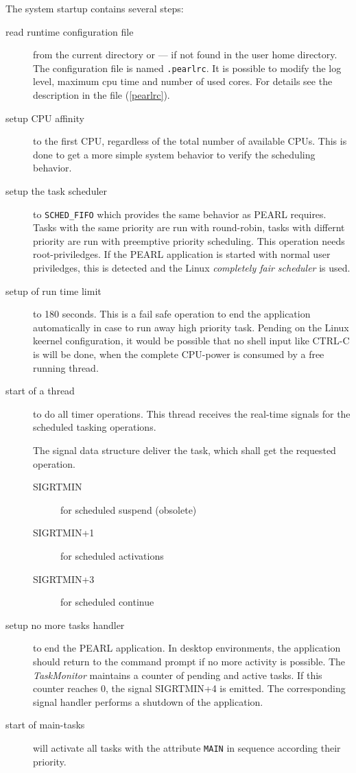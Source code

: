 The system startup contains several steps:
\begin{description}
\item[read runtime configuration file] from the current directory or ---
   if not found in the user home directory.
   The configuration file is named \texttt{.pearlrc}.
   It is possible to modify the log level, maximum cpu time and number of 
   used cores. 
   For details see the description in the file (\ref{pearlrc}).
\item[setup CPU affinity] to the first CPU, regardless of the
   total number of available CPUs. This is done to get a more simple
   system behavior to verify the scheduling behavior.
\item[setup the task scheduler] to \verb|SCHED_FIFO| which provides
   the same behavior as PEARL requires. Tasks with the same priority
   are run with round-robin, tasks with differnt priority are run with
   preemptive priority scheduling.
   This operation needs root-priviledges. If the PEARL application is 
   started with normal user priviledges, this is detected and the 
   Linux {\em completely fair scheduler} is used.
\item[setup of run time limit] to 180 seconds. This is a fail safe
   operation to end the application automatically in case to run away
   high priority task. Pending on the Linux keernel configuration,
   it would be possible that no shell input like CTRL-C is will
   be done, when the complete CPU-power is consumed by a free running thread.
\item[start of a thread] to do all timer operations. This thread 
   receives the real-time signals for the scheduled tasking operations.

   The signal data
   structure deliver the task, which shall get the requested operation.
   \begin{description}
    \item[SIGRTMIN] for scheduled suspend (obsolete)
    \item[SIGRTMIN+1] for scheduled activations
    \item[SIGRTMIN+3] for scheduled continue
    \end{description}
\item[setup no more tasks handler] to end the PEARL application.
   In desktop environments, the application should return to the 
   command prompt if no more activity is possible.
   The {\em TaskMonitor} maintains a counter of pending and active 
   tasks. If this counter reaches $0$, the signal SIGRTMIN+4 is emitted.
   The corresponding signal handler performs a shutdown of the application.
\item[start of main-tasks] will activate all tasks with the attribute
     \verb|MAIN| in sequence according their priority.
\end{description}


